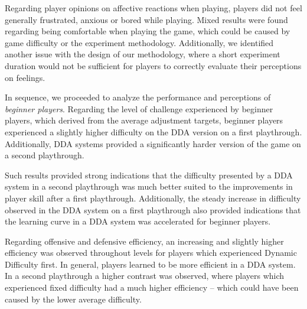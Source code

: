 Regarding player opinions on affective reactions when playing, players did not feel generally frustrated, anxious or bored while playing. Mixed results were found regarding being comfortable when playing the game, which could be caused by game difficulty or the experiment methodology. Additionally, we identified another issue with the design of our methodology, where a short experiment duration would not be sufficient for players to correctly evaluate their perceptions on feelings.



In sequence, we proceeded to analyze the performance and perceptions of \emph{beginner players}. Regarding the level of challenge experienced by beginner players, which derived from the average adjustment targets, beginner players experienced a slightly higher difficulty on the DDA version on a first playthrough. Additionally, DDA systems provided a significantly harder version of the game on a second playthrough.

Such results provided strong indications that the difficulty presented by a DDA system in a second playthrough was much better suited to the improvements in player skill after a first playthrough. Additionally, the steady increase in difficulty observed in the DDA system on a first playthrough also provided indications that the learning curve in a DDA system was accelerated for beginner players.

Regarding offensive and defensive efficiency, an increasing and slightly higher efficiency was observed throughout levels for players which experienced Dynamic Difficulty first. In general, players learned to be more efficient in a DDA system. In a second playthrough a higher contrast was observed, where players which experienced fixed difficulty had a much higher efficiency -- which could have been caused by the lower average difficulty.

